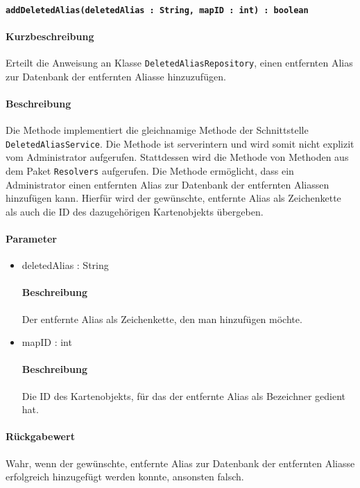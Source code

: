 \paragraph{\texttt{addDeletedAlias(deletedAlias : String, mapID : int) : boolean}}%
\paragraph*{Kurzbeschreibung}
Erteilt die Anweisung an Klasse \texttt{DeletedAliasRepository}, einen entfernten Alias zur Datenbank der entfernten Aliasse hinzuzufügen.
\paragraph*{Beschreibung}
Die Methode implementiert die gleichnamige Methode der Schnittstelle \texttt{DeletedAliasService}.
Die Methode ist serverintern und wird somit nicht explizit vom Administrator aufgerufen.
Stattdessen wird die Methode von Methoden aus dem Paket \texttt{Resolvers} aufgerufen.
Die Methode ermöglicht, dass ein Administrator einen entfernten Alias zur Datenbank der entfernten Aliassen hinzufügen kann.
Hierfür wird der gewünschte, entfernte Alias als Zeichenkette als auch die ID des dazugehörigen Kartenobjekts übergeben.
\paragraph*{Parameter}
\begin{itemize}
    \item deletedAlias : String
    		\paragraph*{Beschreibung}
    		Der entfernte Alias als Zeichenkette, den man hinzufügen möchte.
    \item mapID : int
    		\paragraph*{Beschreibung}
    		Die ID des Kartenobjekts, für das der entfernte Alias als Bezeichner gedient hat.
\end{itemize}
\paragraph*{Rückgabewert}
Wahr, wenn der gewünschte, entfernte Alias zur Datenbank der entfernten Aliasse erfolgreich hinzugefügt werden konnte, ansonsten falsch.
